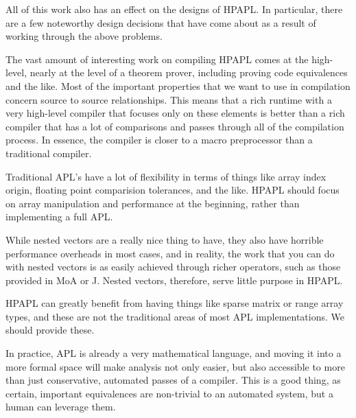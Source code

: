 All of this work also has an effect on the designs of HPAPL. In 
particular, there are a few noteworthy design decisions that have 
come about as a result of working through the above problems.

The vast amount of interesting work on compiling HPAPL comes at the 
high-level, nearly at the level of a theorem prover, including proving 
code equivalences and the like. Most of the important properties that 
we want to use in compilation concern source to source relationships. 
This means that a rich runtime with a very high-level compiler that 
focuses only on these elements is better than a rich compiler that has 
a lot of comparisons and passes through all of the compilation process.
In essence, the compiler is closer to a macro preprocessor than a traditional 
compiler.

Traditional APL's have a lot of flexibility in terms of things like 
array index origin, floating point comparision tolerances, and the like.
HPAPL should focus on array manipulation and performance at the beginning, 
rather than implementing a full APL.

While nested vectors are a really nice thing to have, they also have 
horrible performance overheads in most cases, and in reality, the work 
that you can do with nested vectors is as easily achieved through 
richer operators, such as those provided in MoA or J. Nested vectors, 
therefore, serve little purpose in HPAPL.

HPAPL can greatly benefit from having things like sparse matrix or range 
array types, and these are not the traditional areas of most APL 
implementations. We should provide these.

In practice, APL is already a very mathematical language, and moving it 
into a more formal space will make analysis not only easier, but also 
accessible to more than just conservative, automated passes of a compiler. 
This is a good thing, as certain, important equivalences are non-trivial 
to an automated system, but a human can leverage them.

\bye

